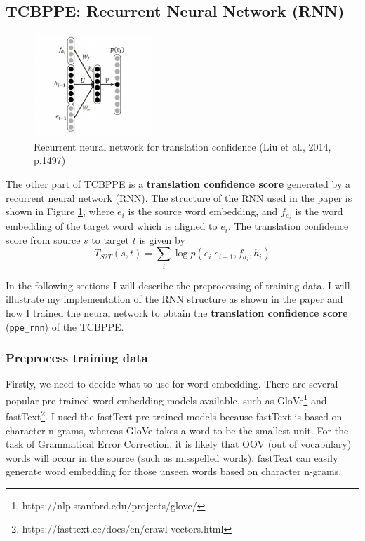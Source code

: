 \documentclass[12pt,a4paper,twoside,openright]{report}
\begin{document}
\subsection{TCBPPE: Recurrent Neural Network (RNN)} \label{section:TCBPPE_rnn}

\begin{figure}[ht]
\centering
\includegraphics[width=0.4\textwidth]{images/rnn_ppe.png}
\caption{Recurrent neural network for translation confidence (Liu et al., 2014, p.1497)}
\label{fig:rnn_ppe}
\end{figure}

The other part of TCBPPE is a \textbf{translation confidence score} generated by a recurrent neural network (RNN). The structure of the RNN used in the paper\cite{r2nn} is shown in Figure \ref{fig:rnn_ppe}, where $e_i$ is the source word embedding, and $f_{a_i}$ is the word embedding of the target word which is aligned to $e_i$. The translation confidence score from source $s$ to target $t$ is given by
\[ T_{S2T}(s, t) = \sum_{i} \log p(e_i|e_{i-1}, f_{a_i}, h_i)\]

In the following sections I will describe the preprocessing of training data. I will illustrate my implementation of the RNN structure as shown in the paper\cite{r2nn} and how I trained the neural network to obtain the \textbf{translation confidence score} (\texttt{ppe\_rnn}) of the TCBPPE.

\subsubsection{Preprocess training data}
Firstly, we need to decide what to use for word embedding. There are several popular pre-trained word embedding models available, such as GloVe\footnote{https://nlp.stanford.edu/projects/glove/} and fastText\footnote{https://fasttext.cc/docs/en/crawl-vectors.html}. I used the fastText pre-trained models because fastText is based on character n-grams, whereas GloVe takes a word to be the smallest unit. For the task of Grammatical Error Correction, it is likely that OOV (out of vocabulary) words will occur in the source (such as misspelled words). fastText can easily generate word embedding for those unseen words based on character n-grams.
\end{document}
